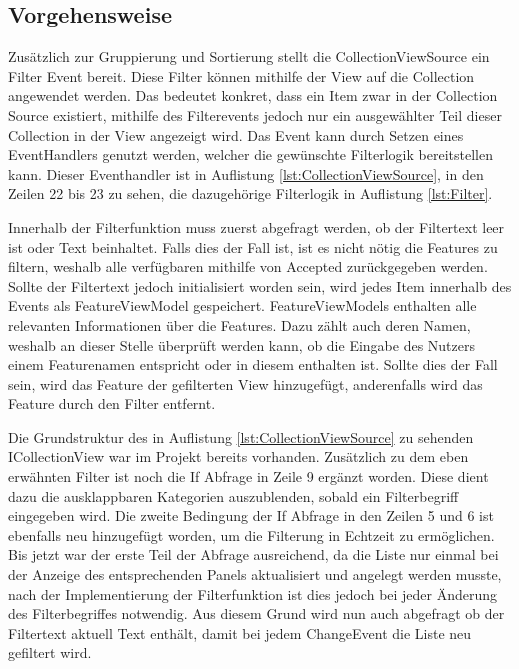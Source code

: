 \subsection {Vorgehensweise}
Zusätzlich zur Gruppierung und Sortierung stellt die CollectionViewSource ein Filter Event bereit.
Diese Filter können mithilfe der View auf die Collection angewendet werden. 
Das bedeutet konkret, dass ein Item zwar in der Collection Source existiert, mithilfe des Filterevents jedoch nur ein ausgewählter Teil dieser Collection in der View angezeigt wird.\cite{dotnetbot.b}
Das Event kann durch Setzen eines EventHandlers genutzt werden, welcher die gewünschte Filterlogik bereitstellen kann.
Dieser Eventhandler ist in Auflistung \ref{lst:CollectionViewSource}, in den Zeilen 22 bis 23 zu sehen, die dazugehörige Filterlogik in Auflistung \ref{lst:Filter}.

\newpage


Innerhalb der Filterfunktion muss zuerst abgefragt werden, ob der Filtertext leer ist oder Text beinhaltet.
Falls dies der Fall ist, ist es nicht nötig die Features zu filtern, weshalb alle verfügbaren mithilfe von Accepted zurückgegeben werden.
Sollte der Filtertext jedoch initialisiert worden sein, wird jedes Item innerhalb des Events als FeatureViewModel gespeichert.
FeatureViewModels enthalten alle relevanten Informationen über die Features.
Dazu zählt auch deren Namen, weshalb an dieser Stelle überprüft werden kann, ob die Eingabe des Nutzers einem Featurenamen entspricht oder in diesem enthalten ist.
Sollte dies der Fall sein, wird das Feature der gefilterten View hinzugefügt, anderenfalls wird das Feature durch den Filter entfernt.



Die Grundstruktur des in Auflistung \ref{lst:CollectionViewSource} zu sehenden ICollectionView war im Projekt bereits vorhanden. 
Zusätzlich zu dem eben erwähnten Filter ist noch die If Abfrage in Zeile 9 ergänzt worden.
Diese dient dazu die ausklappbaren Kategorien auszublenden, sobald ein Filterbegriff eingegeben wird.
Die zweite Bedingung der If Abfrage in den Zeilen 5 und 6 ist ebenfalls neu hinzugefügt worden, um die Filterung in Echtzeit zu ermöglichen.
Bis jetzt war der erste Teil der Abfrage ausreichend, da die Liste nur einmal bei der Anzeige des entsprechenden Panels aktualisiert und angelegt werden musste, nach der Implementierung der Filterfunktion ist dies jedoch bei jeder Änderung des Filterbegriffes notwendig.
Aus diesem Grund wird nun auch abgefragt ob der Filtertext aktuell Text enthält, damit bei jedem ChangeEvent die Liste neu gefiltert wird.

